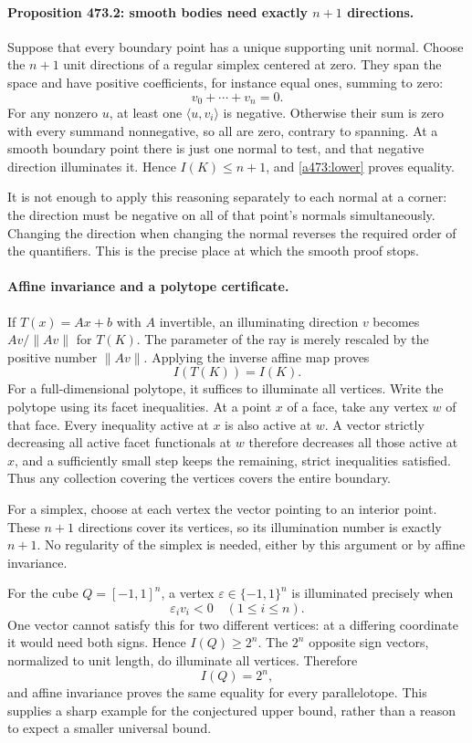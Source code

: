 \documentclass[11pt]{article}
\begin{document}
\paragraph{Proposition 473.2: smooth bodies need exactly $n+1$ directions.}
Suppose that every boundary point has a unique supporting unit normal. Choose the $n+1$ unit directions of a regular simplex centered at zero. They span the space and have positive coefficients, for instance equal ones, summing to zero:
\[
                    v_0+\cdots+v_n=0.
\]
For any nonzero $u$, at least one $\langle u,v_i\rangle$ is negative. Otherwise their sum is zero with every summand nonnegative, so all are zero, contrary to spanning. At a smooth boundary point there is just one normal to test, and that negative direction illuminates it. Hence $I(K)\leq n+1$, and \eqref{a473:lower} proves equality.

It is not enough to apply this reasoning separately to each normal at a corner: the direction must be negative on all of that point's normals simultaneously. Changing the direction when changing the normal reverses the required order of the quantifiers. This is the precise place at which the smooth proof stops.

\paragraph{Affine invariance and a polytope certificate.}
If $T(x)=Ax+b$ with $A$ invertible, an illuminating direction $v$ becomes $Av/\|Av\|$ for $T(K)$. The parameter of the ray is merely rescaled by the positive number $\|Av\|$. Applying the inverse affine map proves
\[
                              I(T(K))=I(K).
\]
For a full-dimensional polytope, it suffices to illuminate all vertices. Write the polytope using its facet inequalities. At a point $x$ of a face, take any vertex $w$ of that face. Every inequality active at $x$ is also active at $w$. A vector strictly decreasing all active facet functionals at $w$ therefore decreases all those active at $x$, and a sufficiently small step keeps the remaining, strict inequalities satisfied. Thus any collection covering the vertices covers the entire boundary.

For a simplex, choose at each vertex the vector pointing to an interior point. These $n+1$ directions cover its vertices, so its illumination number is exactly $n+1$. No regularity of the simplex is needed, either by this argument or by affine invariance.

For the cube $Q=[-1,1]^n$, a vertex $\varepsilon\in\{-1,1\}^n$ is illuminated precisely when
\begin{equation}\label{a473:cube}
                         \varepsilon_i v_i<0\quad(1\leq i\leq n).
\end{equation}
One vector cannot satisfy this for two different vertices: at a differing coordinate it would need both signs. Hence $I(Q)\geq2^n$. The $2^n$ opposite sign vectors, normalized to unit length, do illuminate all vertices. Therefore
\[
                       I(Q)=2^n,
\]
and affine invariance proves the same equality for every parallelotope. This supplies a sharp example for the conjectured upper bound, rather than a reason to expect a smaller universal bound.
\end{document}
